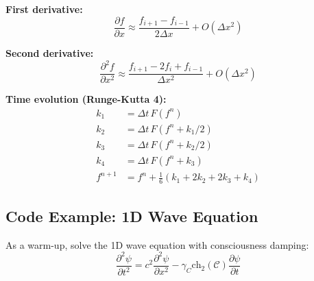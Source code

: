\begin{definition}\label{def:finite-differences}
\textbf{First derivative:}
\begin{equation}
\frac{\partial f}{\partial x} \approx \frac{f_{i+1} - f_{i-1}}{2\Delta x} + O(\Delta x^2)
\end{equation}

\textbf{Second derivative:}
\begin{equation}
\frac{\partial^2 f}{\partial x^2} \approx \frac{f_{i+1} - 2f_i + f_{i-1}}{\Delta x^2} + O(\Delta x^2)
\end{equation}

\textbf{Time evolution (Runge-Kutta 4):}
\begin{align}
k_1 &= \Delta t \, F(f^n)\\
k_2 &= \Delta t \, F(f^n + k_1/2)\\
k_3 &= \Delta t \, F(f^n + k_2/2)\\
k_4 &= \Delta t \, F(f^n + k_3)\\
f^{n+1} &= f^n + \frac{1}{6}(k_1 + 2k_2 + 2k_3 + k_4)
\end{align}
\end{definition}

\subsection{Code Example: 1D Wave Equation}

As a warm-up, solve the 1D wave equation with consciousness damping:
\begin{equation}
\frac{\partial^2 \psi}{\partial t^2} = c^2 \frac{\partial^2 \psi}{\partial x^2} - \gamma_C \text{ch}_2(\mathcal{C}) \frac{\partial \psi}{\partial t}
\end{equation}

